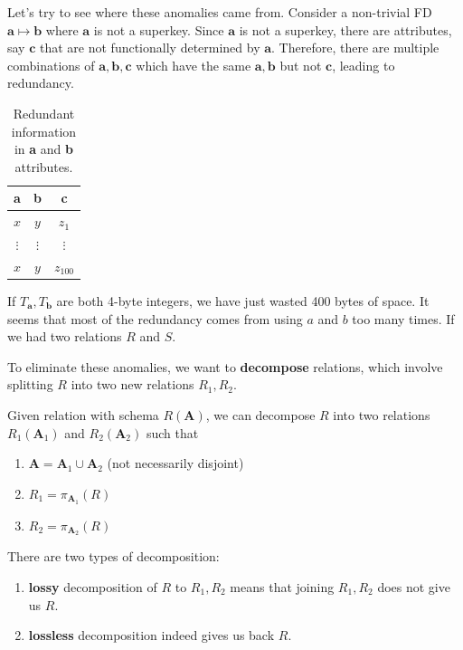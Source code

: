 \documentclass{article}
\begin{document}
    \begin{example}[Redundancies]
      Let's try to see where these anomalies came from. Consider a non-trivial FD $\mathbf{a} \mapsto \mathbf{b}$ where $\mathbf{a}$ is not a superkey. Since $\mathbf{a}$ is not a superkey, there are attributes, say $\mathbf{c}$ that are not functionally determined by $\mathbf{a}$. Therefore, there are multiple combinations of $\mathbf{a, b, c}$ which have the same $\mathbf{a, b}$ but not $\mathbf{c}$, leading to redundancy. 

      \begin{table}[H]
        \centering
        \begin{tabular}{|c|c|c|}
          \hline
          \textbf{a} & \textbf{b} & \textbf{c} \\
          \hline
          $x$ & $y$ & $z_1$ \\ 
          $\vdots$ & $\vdots$ & $\vdots$ \\ 
          $x$ & $y$ & $z_{100}$ \\
          \hline
        \end{tabular}
        \caption{Redundant information in \textbf{a} and \textbf{b} attributes. }
        \label{tab:redundant}
      \end{table}
      If $T_{\mathbf{a}}, T_{\mathbf{b}}$ are both 4-byte integers, we have just wasted 400 bytes of space. It seems that most of the redundancy comes from using $a$ and $b$ too many times. If we had two relations $R$ and $S$. 
    \end{example}

    To eliminate these anomalies, we want to \textbf{decompose} relations, which involve splitting $R$ into two new relations $R_1, R_2$. 

    \begin{definition}[Decomposition]
      Given relation with schema $R(\mathbf{A})$, we can decompose $R$ into two relations $R_1 (\mathbf{A}_1)$ and $R_2 (\mathbf{A}_2)$ such that 
      \begin{enumerate}
        \item $\mathbf{A} = \mathbf{A}_1 \cup \mathbf{A}_2$ (not necessarily disjoint)
        \item $R_1 = \pi_{\mathbf{A}_1} (R)$
        \item $R_2 = \pi_{\mathbf{A}_2} (R)$
      \end{enumerate}
      There are two types of decomposition: 
      \begin{enumerate}
        \item \textbf{lossy} decomposition of $R$ to $R_1, R_2$ means that joining $R_1, R_2$ does not give us $R$. 
        \item \textbf{lossless} decomposition indeed gives us back $R$. 
      \end{enumerate}
    \end{definition}
\end{document}

